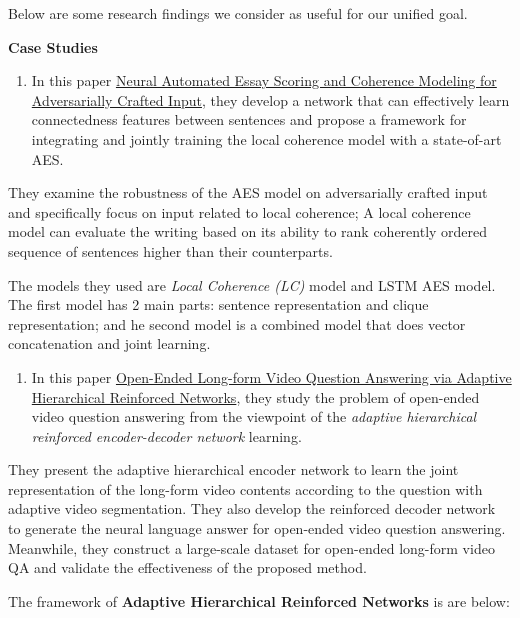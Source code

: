 \documentclass[]{book}
\providecommand{\tightlist}{%
  \setlength{\itemsep}{0pt}\setlength{\parskip}{0pt}}
\theoremstyle{definition}
\theoremstyle{definition}
\theoremstyle{definition}
\theoremstyle{remark}
\begin{document}
Below are some research findings we consider as useful for our unified
goal.

\textbf{Case Studies}

\begin{enumerate}
\def\labelenumi{\arabic{enumi}.}
\tightlist
\item
  In this paper \href{http://aclweb.org/anthology/N18-1024}{Neural
  Automated Essay Scoring and Coherence Modeling for Adversarially
  Crafted Input}, they develop a network that can effectively learn
  connectedness features between sentences and propose a framework for
  integrating and jointly training the local coherence model with a
  state-of-art AES.
\end{enumerate}

They examine the robustness of the AES model on adversarially crafted
input and specifically focus on input related to local coherence; A
local coherence model can evaluate the writing based on its ability to
rank coherently ordered sequence of sentences higher than their
counterparts.

The models they used are \emph{Local Coherence (LC)} model and LSTM AES
model. The first model has 2 main parts: sentence representation and
clique representation; and he second model is a combined model that does
vector concatenation and joint learning.

\begin{enumerate}
\def\labelenumi{\arabic{enumi}.}
\setcounter{enumi}{1}
\tightlist
\item
  In this paper
  \href{https://www.ijcai.org/proceedings/2018/0512.pdf}{Open-Ended
  Long-form Video Question Answering via Adaptive Hierarchical
  Reinforced Networks}, they study the problem of open-ended video
  question answering from the viewpoint of the \emph{adaptive
  hierarchical reinforced encoder-decoder network} learning.
\end{enumerate}

They present the adaptive hierarchical encoder network to learn the
joint representation of the long-form video contents according to the
question with adaptive video segmentation. They also develop the
reinforced decoder network to generate the neural language answer for
open-ended video question answering. Meanwhile, they construct a
large-scale dataset for open-ended long-form video QA and validate the
effectiveness of the proposed method.

The framework of \textbf{Adaptive Hierarchical Reinforced Networks} is
are below:
\end{document}
